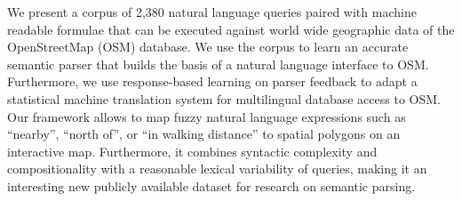 We present a corpus of 2,380 natural language queries paired with machine readable formulae that can be executed against world wide geographic data of the OpenStreetMap (OSM) database. We use the corpus to learn an accurate semantic parser that builds the basis of a natural language interface to OSM. Furthermore, we use response-based learning on parser feedback to adapt a statistical machine translation system for multilingual database access to OSM. Our framework allows to map fuzzy natural language expressions such as ``nearby'', ``north of'', or ``in walking distance'' to spatial polygons on an interactive map. Furthermore, it combines syntactic complexity and compositionality with a reasonable lexical variability of queries, making it an interesting new publicly available dataset for research on semantic parsing.

